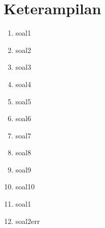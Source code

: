 \chapter*{Keterampilan}
\begin{enumerate}
\item soal1

\item soal2

\item soal3

\item soal4

\item soal5

\item soal6

\item soal7

\item soal8

\item soal9

\item soal10

\item soal1

\item soal2err

\end{enumerate}

